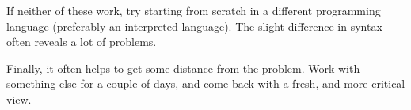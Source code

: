 If neither of these work, try starting from scratch in a different programming language (preferably an interpreted language). The slight difference in syntax often reveals a lot of problems.

Finally, it often helps to get some distance from the problem. Work with something else for a couple of days, and come back with a fresh, and more critical view.

% 
